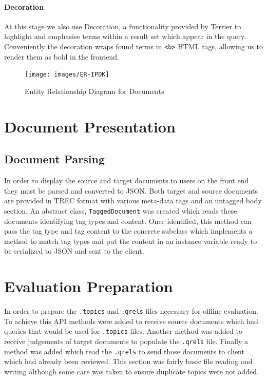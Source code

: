 \documentclass{l4proj}
\newcommand{\code}[1]{\texttt{#1}}
\begin{document}
\paragraph{Decoration}
At this stage we also use Decoration, a functionality provided by Terrier to highlight and emphasise terms within a result set which appear in the query. Conveniently the decoration wraps found terms in \code{<b>} HTML tags, allowing us to render them as bold in the frontend.

\begin{figure}[H]
\centering
\texttt{[image: images/ER-IPDK]}
\caption{Entity Relationship Diagram for Documents}
\label{er}
\end{figure}

\section{Document Presentation}
\subsection{Document Parsing} \label{docparse}
In order to display the source and target documents to users on the front end they must be parsed and converted to JSON.
Both target and source documents are provided in TREC format with various meta-data tags and an untagged body section.
An abstract class, \code{TaggedDocument} was created which reads these documents identifying tag types and content. Once identified, this method can pass the tag type and tag content to the concrete subclass which implements a method to match tag types and put the content in an instance variable ready to be serialized to JSON and sent to the client.

\section{Evaluation Preparation}
In order to prepare the \code{.topics} and \code{.qrels} files necessary for offline evaluation.
To achieve this API methods were added to receive source documents which had queries that would be used for \code{.topics} files. Another method was added to receive judgements of target documents to populate the \code{.qrels} file. Finally a method was added which read the \code{.qrels} to send those documents to client which had already been reviewed.
This section was fairly basic file reading and writing although some care was taken to ensure duplicate topics were not added.
\end{document}
